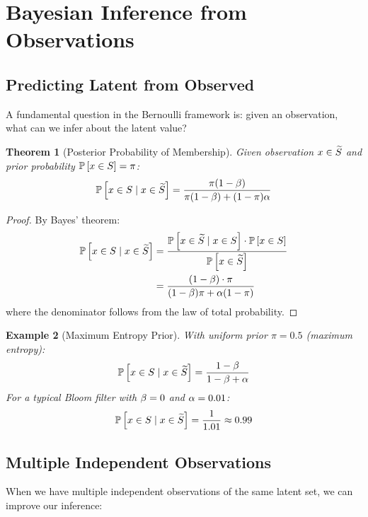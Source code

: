 \documentclass[11pt,final,hidelinks]{article}
\newtheorem{theorem}{Theorem}[section]
\newtheorem{example}[theorem]{Example}
\begin{document}
\section{Bayesian Inference from Observations}

\subsection{Predicting Latent from Observed}

A fundamental question in the Bernoulli framework is: given an observation, what can we infer about the latent value?

\begin{theorem}[Posterior Probability of Membership]
Given observation $x \in \widetilde{S}$ and prior probability $\mathbb{P}\left[x \in S\right] = \pi$:
\begin{equation}
\mathbb{P}\left[x \in S \mid x \in \widetilde{S}\right] = \frac{\pi(1-\beta)}{\pi(1-\beta) + (1-\pi)\alpha}
\end{equation}
\end{theorem}

\begin{proof}
By Bayes' theorem:
\begin{align}
\mathbb{P}\left[x \in S \mid x \in \widetilde{S}\right] &= \frac{\mathbb{P}\left[x \in \widetilde{S} \mid x \in S\right] \cdot \mathbb{P}\left[x \in S\right]}{\mathbb{P}\left[x \in \widetilde{S}\right]} \\
&= \frac{(1-\beta) \cdot \pi}{(1-\beta)\pi + \alpha(1-\pi)}
\end{align}
where the denominator follows from the law of total probability.
\end{proof}

\begin{example}[Maximum Entropy Prior]
With uniform prior $\pi = 0.5$ (maximum entropy):
\begin{equation}
\mathbb{P}\left[x \in S \mid x \in \widetilde{S}\right] = \frac{1-\beta}{1-\beta + \alpha}
\end{equation}
For a typical Bloom filter with $\beta = 0$ and $\alpha = 0.01$:
\begin{equation}
\mathbb{P}\left[x \in S \mid x \in \widetilde{S}\right] = \frac{1}{1.01} \approx 0.99
\end{equation}
\end{example}

\subsection{Multiple Independent Observations}

When we have multiple independent observations of the same latent set, we can improve our inference:
\end{document}
